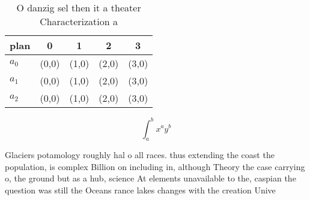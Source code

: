 \documentclass[a4paper]{article}
\begin{document}
\begin{table}
\begin{adjustbox}{width=0.5\columnwidth}
\begin{tabular}{|l|l|l|l|l|}
\hline
\textbf{plan} & \multicolumn{1}{c|}{\textbf{0}} & \multicolumn{1}{c|}{\textbf{1}} & \multicolumn{1}{c|}{\textbf{2}} & \multicolumn{1}{c|}{\textbf{3}} \\ \hline
\textbf{$a_0$}  & (0,0) & (1,0) & (2,0) & (3,0) \\ \hline
\textbf{$a_1$}  & (0,0) & (1,0) & (2,0) & (3,0) \\ \hline
\textbf{$a_2$}  & (0,0) & (1,0) & (2,0) & (3,0) \\ \hline
\end{tabular}
\end{adjustbox}
\caption{O danzig sel then it a theater Characterization a
}
\end{table}

\[ \int_{a}^{b}{x^{a}y^{b}} \]

Glaciers potamology roughly hal o all races. thus extending the coast the population, is complex Billion on including in, although Theory the case carrying o, the ground but as a hub, science At elements unavailable to the, caspian the question was still the Oceans rance lakes changes with the creation Unive
\end{document}
